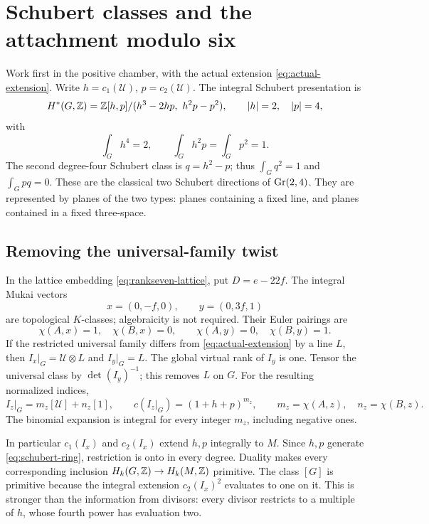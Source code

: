 \section{Schubert classes and the attachment modulo six}\label{sec:schubert}

Work first in the positive chamber, with the actual extension
\eqref{eq:actual-extension}. Write
\(h=c_1(\mathcal U)\), \(p=c_2(\mathcal U)\).
The integral Schubert presentation \cite[Section~3]{buch} is
\begin{equation}\label{eq:schubert-ring}
 H^*(G,\mathbb Z)=\mathbb Z[h,p]/(h^3-2hp,\ h^2p-p^2),\qquad
 |h|=2,\quad |p|=4,
\end{equation}
with
\begin{equation}\label{eq:schubert-evaluations}
 \int_G h^4=2,\qquad\int_G h^2p=\int_G p^2=1.
\end{equation}
The second degree-four Schubert class is \(q=h^2-p\);
thus \(\int_G q^2=1\) and \(\int_G pq=0\).
These are the classical two Schubert directions of \(\operatorname{Gr}(2,4)\).
They are represented by planes of the two types: planes containing
a fixed line, and planes contained in a fixed three-space.

\subsection{Removing the universal-family twist}
In the lattice embedding \eqref{eq:rankseven-lattice}, put
\(D=e-22f\). The integral Mukai vectors
\[
 x=(0,-f,0),\qquad y=(0,3f,1)
\]
are topological \(K\)-classes; algebraicity is not required.
Their Euler pairings are
\[
 \chi(A,x)=1,\quad\chi(B,x)=0,\qquad
 \chi(A,y)=0,\quad\chi(B,y)=1.
\]
If the restricted universal family differs from
\eqref{eq:actual-extension} by a line \(L\), then
\(I_x|_G=\mathcal U\otimes L\) and \(I_y|_G=L\).
The global virtual rank of \(I_y\) is one. Tensor the universal
class by \(\det(I_y)^{-1}\); this removes \(L\) on \(G\).
For the resulting normalized indices,
\begin{equation}\label{eq:index-restrictions}
 I_z|_G=m_z[\mathcal U]+n_z[1],\qquad
 c(I_z|_G)=(1+h+p)^{m_z},\qquad
 m_z=\chi(A,z),\quad n_z=\chi(B,z).
\end{equation}
The binomial expansion is integral for every integer \(m_z\),
including negative ones.

In particular \(c_1(I_x)\) and \(c_2(I_x)\) extend \(h,p\)
integrally to \(M\). Since \(h,p\) generate
\eqref{eq:schubert-ring}, restriction is onto in every degree.
Duality makes every corresponding inclusion
\(H_k(G,\mathbb Z)\to H_k(M,\mathbb Z)\) primitive.
The class \([G]\) is primitive because the integral extension
\(c_2(I_x)^2\) evaluates to one on it.
This is stronger than the information from divisors:
every divisor restricts to a multiple of \(h\), whose fourth
power has evaluation two.

